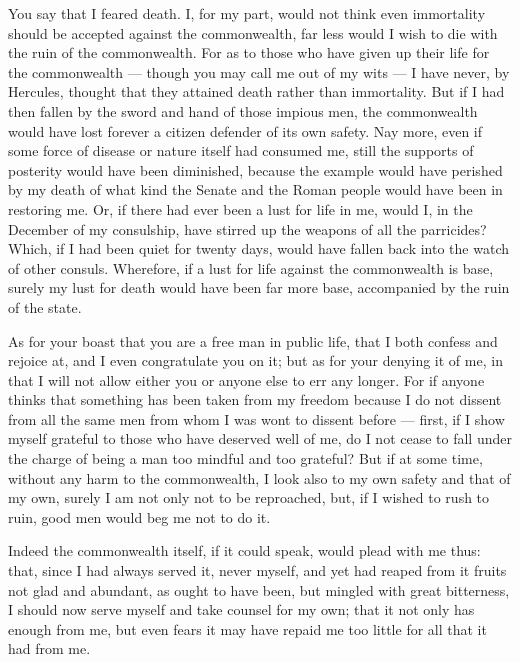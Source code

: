  You say that I feared death. I, for my part, would not think even immortality should be accepted against the commonwealth, far less would I wish to die with the ruin of the commonwealth. For as to those who have given up their life for the commonwealth --- though you may call me out of my wits --- I have never, by Hercules, thought that they attained death rather than immortality. But if I had then fallen by the sword and hand of those impious men, the commonwealth would have lost forever a citizen defender of its own safety. Nay more, even if some force of disease or nature itself had consumed me, still the supports of posterity would have been diminished, because the example would have perished by my death of what kind the Senate and the Roman people would have been in restoring me. Or, if there had ever been a lust for life in me, would I, in the December of my consulship, have stirred up the weapons of all the parricides? Which, if I had been quiet for twenty days, would have fallen back into the watch of other consuls. Wherefore, if a lust for life against the commonwealth is base, surely my lust for death would have been far more base, accompanied by the ruin of the state.

 As for your boast that you are a free man in public life, that I both confess and rejoice at, and I even congratulate you on it; but as for your denying it of me, in that I will not allow either you or anyone else to err any longer. For if anyone thinks that something has been taken from my freedom because I do not dissent from all the same men from whom I was wont to dissent before --- first, if I show myself grateful to those who have deserved well of me, do I not cease to fall under the charge of being a man too mindful and too grateful? But if at some time, without any harm to the commonwealth, I look also to my own safety and that of my own, surely I am not only not to be reproached, but, if I wished to rush to ruin, good men would beg me not to do it.

 Indeed the commonwealth itself, if it could speak, would plead with me thus: that, since I had always served it, never myself, and yet had reaped from it fruits not glad and abundant, as ought to have been, but mingled with great bitterness, I should now serve myself and take counsel for my own; that it not only has enough from me, but even fears it may have repaid me too little for all that it had from me.

